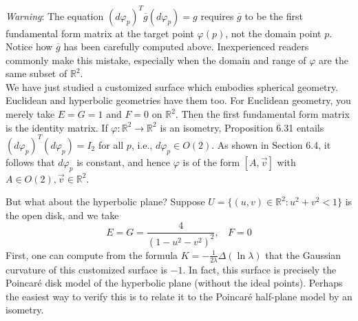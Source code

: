 \documentclass[leqno]{book}
\begin{document}
\noindent\emph{Warning}: The equation $(d\varphi_p)^T\overline g(d\varphi_p)=g$ requires $\overline g$ to be the first fundamental form matrix at the target point $\varphi(p)$, not the domain point $p$.  Notice how $\overline g$ has been carefully computed above.  Inexperienced readers commonly make this mistake, especially when the domain and range of $\varphi$ are the same subset of $\mathbb R^2$.\\

\noindent We have just studied a customized surface which embodies spherical geometry.  Euclidean and hyperbolic geometries have them too.  For Euclidean geometry, you merely take $E=G=1$ and $F=0$ on $\mathbb R^2$.  Then the first fundamental form matrix is the identity matrix.  If $\varphi:\mathbb R^2\to\mathbb R^2$ is an isometry, Proposition 6.31 entails $(d\varphi_p)^T(d\varphi_p)=I_2$ for all $p$, i.e., $d\varphi_p\in O(2)$.  As shown in Section 6.4, it follows that $d\varphi_p$ is constant, and hence $\varphi$ is of the form $[A,\vec v]$ with $A\in O(2),\vec v\in\mathbb R^2$.

But what about the hyperbolic plane?  Suppose $U=\{(u,v)\in\mathbb R^2:u^2+v^2<1\}$ is the open disk, and we take
$$E=G=\frac 4{(1-u^2-v^2)^2},~~~~F=0$$
First, one can compute from the formula $K=-\frac 1{2\lambda}\Delta(\ln\lambda)$ that the Gaussian curvature of this customized surface is $-1$.  In fact, this surface is precisely the Poincar\'e disk model of the hyperbolic plane (without the ideal points).  Perhaps the easiest way to verify this is to relate it to the Poincar\'e half-plane model by an isometry.
\end{document}

